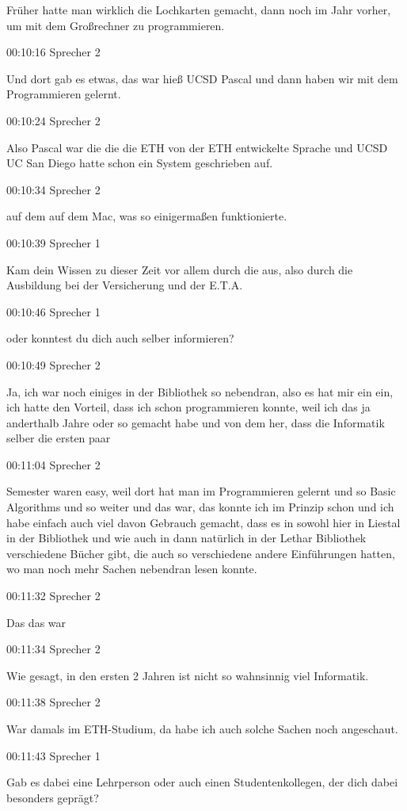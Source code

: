 Früher hatte man wirklich die Lochkarten gemacht, dann noch im Jahr
vorher, um mit dem Großrechner zu programmieren.

00:10:16 Sprecher 2

Und dort gab es etwas, das war hieß UCSD Pascal und dann haben wir mit
dem Programmieren gelernt.

00:10:24 Sprecher 2

Also Pascal war die die die ETH von der ETH entwickelte Sprache und UCSD
UC San Diego hatte schon ein System geschrieben auf.

00:10:34 Sprecher 2

auf dem auf dem Mac, was so einigermaßen funktionierte.

00:10:39 Sprecher 1

Kam dein Wissen zu dieser Zeit vor allem durch die aus, also durch die
Ausbildung bei der Versicherung und der E.T.A.

00:10:46 Sprecher 1

oder konntest du dich auch selber informieren?

00:10:49 Sprecher 2

Ja, ich war noch einiges in der Bibliothek so nebendran, also es hat mir
ein ein, ich hatte den Vorteil, dass ich schon programmieren konnte,
weil ich das ja anderthalb Jahre oder so gemacht habe und von dem her,
dass die Informatik selber die ersten paar

00:11:04 Sprecher 2

Semester waren easy, weil dort hat man im Programmieren gelernt und so
Basic Algorithms und so weiter und das war, das konnte ich im Prinzip
schon und ich habe einfach auch viel davon Gebrauch gemacht, dass es in
sowohl hier in Liestal in der Bibliothek und wie auch in dann natürlich
in der Lethar Bibliothek verschiedene Bücher gibt, die auch so
verschiedene andere Einführungen hatten, wo man noch mehr Sachen
nebendran lesen konnte.

00:11:32 Sprecher 2

Das das war

00:11:34 Sprecher 2

Wie gesagt, in den ersten 2 Jahren ist nicht so wahnsinnig viel
Informatik.

00:11:38 Sprecher 2

War damals im ETH-Studium, da habe ich auch solche Sachen noch
angeschaut.

00:11:43 Sprecher 1

Gab es dabei eine Lehrperson oder auch einen Studentenkollegen, der dich
dabei besonders geprägt?

